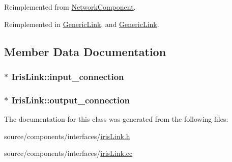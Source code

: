 Reimplemented from \hyperlink{classNetworkComponent_9bb9874e1f5705588cb3d9c201d8fc6f}{NetworkComponent}.

Reimplemented in \hyperlink{classGenericLink_64dad2c98848fb48b3b572887031167b}{GenericLink}, and \hyperlink{classGenericLink_64dad2c98848fb48b3b572887031167b}{GenericLink}.

\subsection{Member Data Documentation}
\hypertarget{classIrisLink_be439e50b48bbe45bb99c2546f83f9ee}{
\subsubsection[{input\_\-connection}]{$\ast$ {\bf IrisLink::input\_\-connection}}}
\label{classIrisLink_be439e50b48bbe45bb99c2546f83f9ee}


\hypertarget{classIrisLink_137f7502dc308ec2c812753a7ef0b72b}{
\subsubsection[{output\_\-connection}]{$\ast$ {\bf IrisLink::output\_\-connection}}}
\label{classIrisLink_137f7502dc308ec2c812753a7ef0b72b}




The documentation for this class was generated from the following files:\begin{CompactItemize}
\item 
source/components/interfaces/\hyperlink{irisLink_8h}{irisLink.h}\item 
source/components/interfaces/\hyperlink{irisLink_8cc}{irisLink.cc}\end{CompactItemize}
